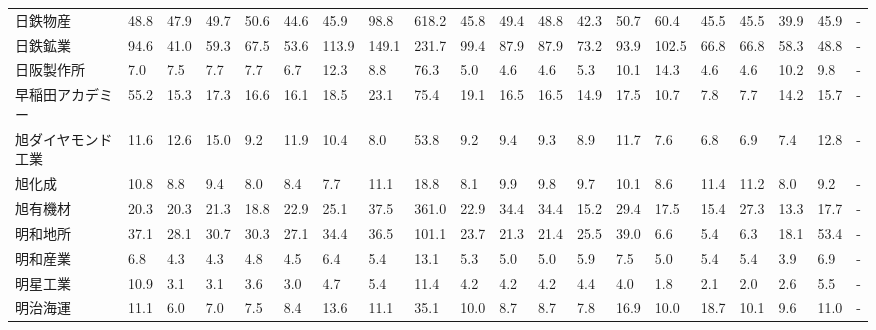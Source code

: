 \begin{tabular}{llllllllllllllllllll}
日鉄物産            &   48.8 &   47.9 &      49.7 &      50.6 &       44.6 &    45.9 &    98.8 &    618.2 &    45.8 &    49.4 &   48.8 &   42.3 &    50.7 &    60.4 &    45.5 &   45.5 &   39.9 &    45.9 &      - \\
日鉄鉱業            &   94.6 &   41.0 &      59.3 &      67.5 &       53.6 &   113.9 &   149.1 &    231.7 &    99.4 &    87.9 &   87.9 &   73.2 &    93.9 &   102.5 &    66.8 &   66.8 &   58.3 &    48.8 &      - \\
日阪製作所           &    7.0 &    7.5 &       7.7 &       7.7 &        6.7 &    12.3 &     8.8 &     76.3 &     5.0 &     4.6 &    4.6 &    5.3 &    10.1 &    14.3 &     4.6 &    4.6 &   10.2 &     9.8 &      - \\
早稲田アカデミー        &   55.2 &   15.3 &      17.3 &      16.6 &       16.1 &    18.5 &    23.1 &     75.4 &    19.1 &    16.5 &   16.5 &   14.9 &    17.5 &    10.7 &     7.8 &    7.7 &   14.2 &    15.7 &      - \\
旭ダイヤモンド工業       &   11.6 &   12.6 &      15.0 &       9.2 &       11.9 &    10.4 &     8.0 &     53.8 &     9.2 &     9.4 &    9.3 &    8.9 &    11.7 &     7.6 &     6.8 &    6.9 &    7.4 &    12.8 &      - \\
旭化成             &   10.8 &    8.8 &       9.4 &       8.0 &        8.4 &     7.7 &    11.1 &     18.8 &     8.1 &     9.9 &    9.8 &    9.7 &    10.1 &     8.6 &    11.4 &   11.2 &    8.0 &     9.2 &      - \\
旭有機材            &   20.3 &   20.3 &      21.3 &      18.8 &       22.9 &    25.1 &    37.5 &    361.0 &    22.9 &    34.4 &   34.4 &   15.2 &    29.4 &    17.5 &    15.4 &   27.3 &   13.3 &    17.7 &      - \\
明和地所            &   37.1 &   28.1 &      30.7 &      30.3 &       27.1 &    34.4 &    36.5 &    101.1 &    23.7 &    21.3 &   21.4 &   25.5 &    39.0 &     6.6 &     5.4 &    6.3 &   18.1 &    53.4 &      - \\
明和産業            &    6.8 &    4.3 &       4.3 &       4.8 &        4.5 &     6.4 &     5.4 &     13.1 &     5.3 &     5.0 &    5.0 &    5.9 &     7.5 &     5.0 &     5.4 &    5.4 &    3.9 &     6.9 &      - \\
明星工業            &   10.9 &    3.1 &       3.1 &       3.6 &        3.0 &     4.7 &     5.4 &     11.4 &     4.2 &     4.2 &    4.2 &    4.4 &     4.0 &     1.8 &     2.1 &    2.0 &    2.6 &     5.5 &      - \\
明治海運            &   11.1 &    6.0 &       7.0 &       7.5 &        8.4 &    13.6 &    11.1 &     35.1 &    10.0 &     8.7 &    8.7 &    7.8 &    16.9 &    10.0 &    18.7 &   10.1 &    9.6 &    11.0 &      - \\

\end{tabular}
